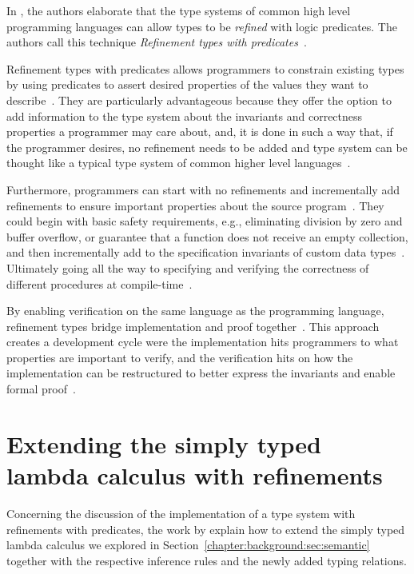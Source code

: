 \documentclass[
  oneside,
  english,
  coorientadorbanca,
  noabntexcite
]{ufsc-thesis-rn46-2019}
\begin{document}
In \textcite{jhala2020tutorial}, the authors elaborate that the type systems of common high level programming languages can allow types to be \textit{refined} with logic predicates.
The authors call this technique \textit{Refinement types with predicates}~\cite{jhala2020tutorial}.

Refinement types with predicates allows programmers to constrain existing types by using predicates to assert desired properties of the values they want to describe~\cite{jhala2020tutorial}.
They are particularly advantageous because they offer the option to add information to the type system about the invariants and correctness properties a programmer may care about, and, it is done in such a way that, if the programmer desires, no refinement needs to be added and type system can be thought like a typical type system of common higher level languages~\cite{jhala2020tutorial}.

Furthermore, programmers can start with no refinements and incrementally add refinements to ensure important properties about the source program~\cite{jhala2020tutorial}.
They could begin with basic safety requirements, e.g., eliminating division by zero and buffer overflow, or guarantee that a function does not receive an empty collection, and then incrementally add to the specification invariants of custom data types~\cite{jhala2020tutorial}.
Ultimately going all the way to specifying and verifying the correctness of different procedures at compile-time~\cite{jhala2020tutorial}.

By enabling verification on the same language as the programming language, refinement types bridge implementation and proof together~\cite{jhala2020tutorial}.
This approach creates a development cycle were the implementation hits programmers to what properties are important to verify, and the verification hits on how the implementation can be restructured to better express the invariants and enable formal proof~\cite{jhala2020tutorial}.


\section{Extending the simply typed lambda calculus with refinements}

Concerning the discussion of the implementation of a type system with refinements with predicates, the work by \textcite{jhala2020tutorial} explain how to extend the simply typed lambda calculus we explored in Section~\ref{chapter:background:sec:semantic} together with the respective inference rules and the newly added typing relations.
\end{document}
